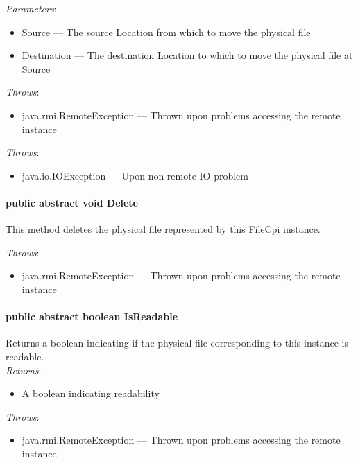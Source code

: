 \documentclass[$Date: 2003/06/26 19:29:31 $]{glabarticle}
\begin{document}
 \textit{Parameters}:
 \begin{itemize}
 \item[] Source --- The source Location from which to move the physical file
 \item[] Destination --- The destination Location to which to move the physical file at Source
 \end{itemize}
 
 \textit{Throws}:
 \begin{itemize}
 \item[] java.rmi.RemoteException --- Thrown upon problems accessing the remote instance 
 \end{itemize}
 
\textit{Throws}:
\begin{itemize}
\item[] java.io.IOException --- Upon non-remote IO problem 
\end{itemize}
 
\paragraph{public abstract void Delete}

This method deletes the physical file represented by this FileCpi instance.

 \textit{Throws}:
 \begin{itemize}
 \item[] java.rmi.RemoteException --- Thrown upon problems accessing the remote instance 
 \end{itemize}
 
\paragraph{public abstract boolean IsReadable}

Returns a boolean indicating if the physical file corresponding to
this instance is readable.\\

\textit{Returns}:
\begin{itemize}
\item[] A boolean indicating readability
\end{itemize}

 \textit{Throws}:
 \begin{itemize}
 \item[] java.rmi.RemoteException --- Thrown upon problems accessing the remote instance 
 \end{itemize}
 
\end{document}

